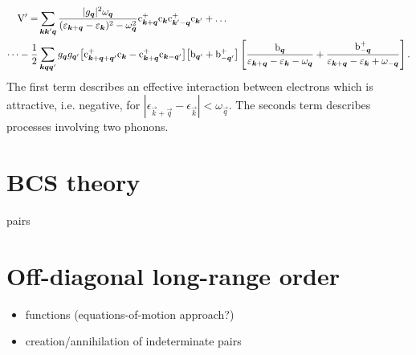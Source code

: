 \begin{align*}
    \mathrm V' = &\sum_{\boldsymbol k \boldsymbol k' \boldsymbol q}
    \frac {|g_{\boldsymbol q}|^2 \omega_{\boldsymbol q}}
    {(\varepsilon_{\boldsymbol k + \boldsymbol q} - \varepsilon_{\boldsymbol k})^2 - \omega_{\boldsymbol q}^2}
    \mathrm c_{\boldsymbol k  + \boldsymbol q}^+ \mathrm c_{\boldsymbol k }
    \mathrm c_{\boldsymbol k' - \boldsymbol q}^+ \mathrm c_{\boldsymbol k'} + \dots
    \\
    \dots - \frac 1 2 &\sum_{\boldsymbol k \boldsymbol q \boldsymbol q'} g_{\boldsymbol q} g_{\boldsymbol q'}
    \big[ \mathrm c_{\boldsymbol k + \boldsymbol q + \boldsymbol q'}^+ \mathrm c_{\boldsymbol k}
    - \mathrm c_{\boldsymbol k + \boldsymbol q}^+ \mathrm c_{\boldsymbol k - \boldsymbol q'} \big]
    \big[ \mathrm b_{\boldsymbol q'} + \mathrm b_{-\boldsymbol q'}^+ \big] \left[
        \frac {\mathrm b_{\boldsymbol q}}
        {\varepsilon_{\boldsymbol k + \boldsymbol q} - \varepsilon_{\boldsymbol k} - \omega_{\boldsymbol q}}
        + \frac {\mathrm b_{-\boldsymbol q}^+}
        {\varepsilon_{\boldsymbol k + \boldsymbol q} - \varepsilon_{\boldsymbol k} + \omega_{-\boldsymbol q}}
    \right].
\end{align*}
%
The first term describes an effective interaction between electrons which is
attractive, i.e. negative, for $|\epsilon_{\vec k + \vec q} - \epsilon_{\vec k}|
< \omega_{\vec q}$. The seconds term describes processes involving two phonons.

\section{BCS theory}

 pairs

\section{Off-diagonal long-range order}

\begin{itemize}
    \item {} functions (equations-of-motion approach?)
    \item creation/annihilation of indeterminate  pairs
\end{itemize}
